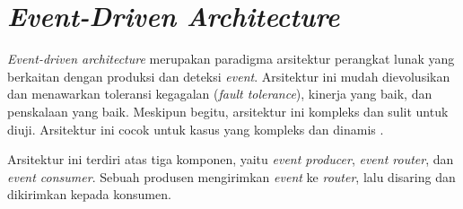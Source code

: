 \section{\textit{Event-Driven Architecture}}

\textit{Event-driven architecture} merupakan paradigma arsitektur perangkat lunak yang berkaitan dengan produksi dan deteksi \textit{event}. Arsitektur ini mudah dievolusikan dan menawarkan toleransi kegagalan (\textit{fault tolerance}), kinerja yang baik, dan penskalaan yang baik. Meskipun begitu, arsitektur ini kompleks dan sulit untuk diuji. Arsitektur ini cocok untuk kasus yang kompleks dan dinamis \parencite{softwareArchitecture}.

Arsitektur ini terdiri atas tiga komponen, yaitu \textit{event producer}, \textit{event router}, dan \textit{event consumer}. Sebuah produsen mengirimkan \textit{event} ke \textit{router}, lalu disaring dan dikirimkan kepada konsumen.





